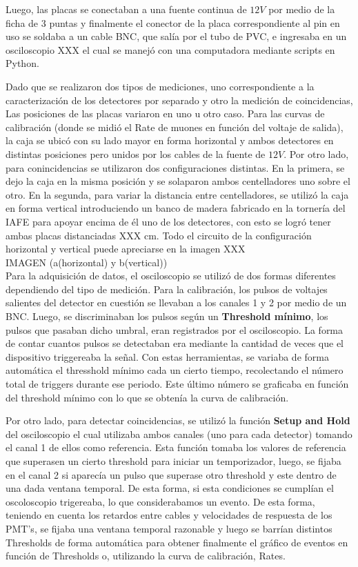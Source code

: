 \documentclass[12pt,a4paper]{article}
\numberwithin{equation}{section}
\begin{document}
Luego, las placas se conectaban a una fuente continua de $ 12V $ por medio de la ficha de 3 puntas y finalmente el conector de la placa correspondiente al pin en uso se soldaba a un cable BNC, que salía por el tubo de PVC, e ingresaba en un osciloscopio XXX el cual se manejó con una computadora mediante scripts en Python. 

Dado que se realizaron dos tipos de mediciones, uno correspondiente a la caracterización de los detectores por separado y otro la medición de coincidencias, Las posiciones de las placas variaron en uno u otro caso. Para las curvas de calibración (donde se midió el Rate de muones en función del voltaje de salida), la caja se ubicó con su lado mayor en forma horizontal y ambos detectores en distintas posiciones pero unidos por los cables de la fuente de $ 12V $. Por otro lado, para conincidencias se utilizaron dos configuraciones distintas. En la primera, se dejo la caja en la misma posición y se solaparon ambos centelladores uno sobre el otro. En la segunda, para variar la distancia entre centelladores, se utilizó la caja en forma vertical introduciendo un banco de madera fabricado en la tornería del IAFE para apoyar encima de él uno de los detectores, con esto se logró tener ambas placas distanciadas XXX cm. Todo el circuito de la configuración horizontal y vertical puede apreciarse en la imagen XXX\\

IMAGEN (a(horizontal) y b(vertical))\\

Para la adquisición de datos, el osciloscopio se utilizó de dos formas diferentes dependiendo del tipo de medición. Para la calibración, los pulsos de voltajes salientes del detector en cuestión se llevaban a los canales 1 y 2 por medio de un BNC. Luego, se discriminaban los pulsos según un \textbf{Threshold mínimo}, los pulsos que pasaban dicho umbral, eran registrados por el osciloscopio. La forma de contar cuantos pulsos se detectaban era mediante la cantidad de veces que el dispositivo triggereaba la señal. Con estas herramientas, se variaba de forma automática el thresshold mínimo cada un cierto tiempo, recolectando el número total de triggers durante ese periodo. Este último número se graficaba en función del threshold mínimo con lo que se obtenía la curva de calibración. 

Por otro lado, para detectar coincidencias, se utilizó la función \textbf{Setup and Hold} del osciloscopio el cual utilizaba ambos canales (uno para cada detector) tomando el canal 1 de ellos como referencia. Esta función tomaba los valores de referencia que superasen un cierto threshold para iniciar un temporizador, luego, se fijaba en el canal 2 si aparecía un pulso que superase otro threshold y este dentro de una dada ventana temporal. De esta forma, si esta condiciones se cumplían el oscoloscopio trigereaba, lo que considerabamos un evento. De esta forma, teniendo en cuenta los retardos entre cables y velocidades de respuesta de los PMT's, se  fijaba una ventana temporal razonable y luego se barrían distintos Thresholds de forma automática para obtener finalmente el gráfico de eventos en función de Thresholds o, utilizando la curva de calibración, Rates.
\end{document}

